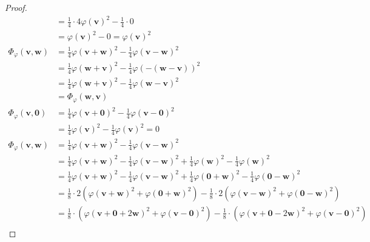 \documentclass[dvipdfmx]{jsarticle}
\begin{document}
\begin{proof}
\begin{align*}
&= \frac{1}{4} \cdot 4{\varphi\left( \mathbf{v} \right)}^{2} - \frac{1}{4} \cdot 0\\
&= {\varphi\left( \mathbf{v} \right)}^{2} - 0 = {\varphi\left( \mathbf{v} \right)}^{2}\\
\varPhi_{\varphi}\left( \mathbf{v},\mathbf{w} \right) &= \frac{1}{4}{\varphi\left( \mathbf{v} + \mathbf{w} \right)}^{2} - \frac{1}{4}{\varphi\left( \mathbf{v} - \mathbf{w} \right)}^{2}\\
&= \frac{1}{4}{\varphi\left( \mathbf{w} + \mathbf{v} \right)}^{2} - \frac{1}{4}{\varphi\left( - \left( \mathbf{w} - \mathbf{v} \right) \right)}^{2}\\
&= \frac{1}{4}{\varphi\left( \mathbf{w} + \mathbf{v} \right)}^{2} - \frac{1}{4}{\varphi\left( \mathbf{w} - \mathbf{v} \right)}^{2}\\
&= \varPhi_{\varphi}\left( \mathbf{w},\mathbf{v} \right)\\
\varPhi_{\varphi}\left( \mathbf{v},\mathbf{0} \right) &= \frac{1}{4}{\varphi\left( \mathbf{v} + \mathbf{0} \right)}^{2} - \frac{1}{4}{\varphi\left( \mathbf{v} - \mathbf{0} \right)}^{2}\\
&= \frac{1}{4}{\varphi\left( \mathbf{v} \right)}^{2} - \frac{1}{4}{\varphi\left( \mathbf{v} \right)}^{2} = 0 \\
\varPhi_{\varphi}\left( \mathbf{v},\mathbf{w} \right) &= \frac{1}{4}{\varphi\left( \mathbf{v} + \mathbf{w} \right)}^{2} - \frac{1}{4}{\varphi\left( \mathbf{v} - \mathbf{w} \right)}^{2}\\
&= \frac{1}{4}{\varphi\left( \mathbf{v} + \mathbf{w} \right)}^{2} - \frac{1}{4}{\varphi\left( \mathbf{v} - \mathbf{w} \right)}^{2} + \frac{1}{4}{\varphi\left( \mathbf{w} \right)}^{2} - \frac{1}{4}{\varphi\left( \mathbf{w} \right)}^{2}\\
&= \frac{1}{4}{\varphi\left( \mathbf{v} + \mathbf{w} \right)}^{2} - \frac{1}{4}{\varphi\left( \mathbf{v} - \mathbf{w} \right)}^{2} + \frac{1}{4}{\varphi\left( \mathbf{0} + \mathbf{w} \right)}^{2} - \frac{1}{4}{\varphi\left( \mathbf{0} - \mathbf{w} \right)}^{2}\\
&= \frac{1}{8} \cdot 2\left( {\varphi\left( \mathbf{v} + \mathbf{w} \right)}^{2} + {\varphi\left( \mathbf{0} + \mathbf{w} \right)}^{2} \right) - \frac{1}{8} \cdot 2\left( {\varphi\left( \mathbf{v} - \mathbf{w} \right)}^{2} + {\varphi\left( \mathbf{0} - \mathbf{w} \right)}^{2} \right)\\
&= \frac{1}{8} \cdot \left( {\varphi\left( \mathbf{v} + \mathbf{0} + 2\mathbf{w} \right)}^{2} + {\varphi\left( \mathbf{v} - \mathbf{0} \right)}^{2} \right) - \frac{1}{8} \cdot \left( {\varphi\left( \mathbf{v} + \mathbf{0} - 2\mathbf{w} \right)}^{2} + {\varphi\left( \mathbf{v} - \mathbf{0} \right)}^{2} \right)\\

\end{align*}
\end{proof}
\end{document}

